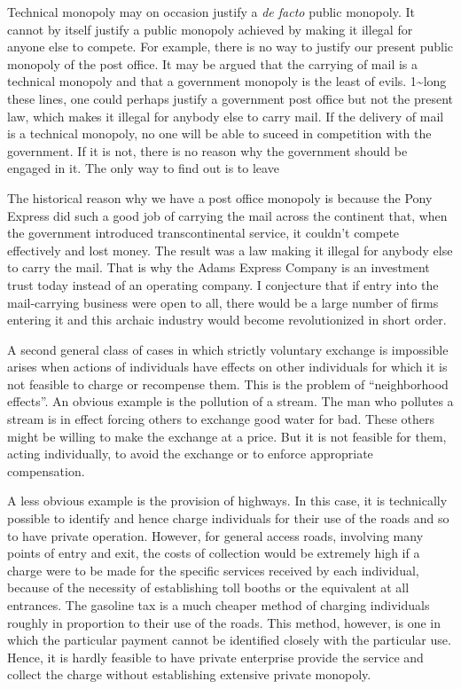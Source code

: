 \documentclass[11pt,openany]{book}
\begin{document}
Technical monopoly may on occasion justify a \emph{de facto} public monopoly. It cannot by itself justify a public monopoly achieved by making it illegal for anyone else to compete. For example, there is no way to justify our present public monopoly of the post office. It may be argued that the carrying of mail is a technical monopoly and that a government monopoly is the least of evils. 1\textasciitilde{}long these lines, one could perhaps justify a government post office but not the present law, which makes it illegal for anybody else to carry mail. If the delivery of mail is a technical monopoly, no one will be able to suceed in competition with the government. If it is not, there is no reason why the government should be engaged in it. The only way to find out is to leave

The historical reason why we have a post office monopoly is because the Pony Express did such a good job of carrying the mail across the continent that, when the government introduced transcontinental service, it couldn't compete effectively and lost money. The result was a law making it illegal for anybody else to carry the mail. That is why the Adams Express Company is an investment trust today instead of an operating company. I conjecture that if entry into the mail-carrying business were open to all, there would be a large number of firms entering it and this archaic industry would become revolutionized in short order.

A second general class of cases in which strictly voluntary exchange is impossible arises when actions of individuals have effects on other individuals for which it is not feasible to charge or recompense them. This is the problem of ``neighborhood effects''. An obvious example is the pollution of a stream. The man who pollutes a stream is in effect forcing others to exchange good water for bad. These others might be willing to make the exchange at a price. But it is not feasible for them, acting individually, to avoid the exchange or to enforce appropriate compensation.

A less obvious example is the provision of highways. In this case, it is technically possible to identify and hence charge individuals for their use of the roads and so to have private operation. However, for general access roads, involving many points of entry and exit, the costs of collection would be extremely high if a charge were to be made for the specific services received by each individual, because of the necessity of establishing toll booths or the equivalent at all entrances. The gasoline tax is a much cheaper method of charging individuals roughly in proportion to their use of the roads. This method, however, is one in which the particular payment cannot be identified closely with the particular use. Hence, it is hardly feasible to have private enterprise provide the service and collect the charge without establishing extensive private monopoly.
\end{document}
